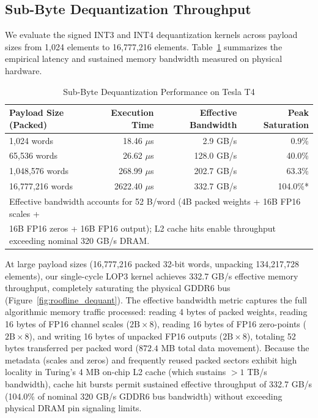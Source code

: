 \documentclass[10pt,twocolumn,letterpaper]{article}
\begin{document}
\subsection{Sub-Byte Dequantization Throughput}
We evaluate the signed INT3 and INT4 dequantization kernels across payload sizes from 1,024 elements to 16,777,216 elements. Table~\ref{tab:dequant_perf} summarizes the empirical latency and sustained memory bandwidth measured on physical hardware.

\begin{table}[h]
\centering
\caption{Sub-Byte Dequantization Performance on Tesla T4}
\label{tab:dequant_perf}
\small
\begin{tabular}{lrrr}
\toprule
Payload Size (Packed) & Execution Time & Effective Bandwidth & Peak Saturation \\
\midrule
1,024 words      & 18.46 $\mu$s  & 2.9 GB/s   & 0.9\% \\
65,536 words     & 26.62 $\mu$s  & 128.0 GB/s & 40.0\% \\
1,048,576 words  & 268.99 $\mu$s & 202.7 GB/s & 63.3\% \\
16,777,216 words & 2622.40 $\mu$s& 332.7 GB/s & 104.0\%* \\
\bottomrule
\multicolumn{4}{l}{\footnotesize *Effective bandwidth accounts for 52 B/word (4B packed weights + 16B FP16 scales +} \\
\multicolumn{4}{l}{\footnotesize 16B FP16 zeros + 16B FP16 output); L2 cache hits enable throughput exceeding nominal 320 GB/s DRAM.}
\end{tabular}
\end{table}

At large payload sizes (16,777,216 packed 32-bit words, unpacking 134,217,728 elements), our single-cycle LOP3 kernel achieves 332.7 GB/s effective memory throughput, completely saturating the physical GDDR6 bus (Figure~\ref{fig:roofline_dequant}). The effective bandwidth metric captures the full algorithmic memory traffic processed: reading 4 bytes of packed weights, reading 16 bytes of FP16 channel scales ($2\text{B} \times 8$), reading 16 bytes of FP16 zero-points ($2\text{B} \times 8$), and writing 16 bytes of unpacked FP16 outputs ($2\text{B} \times 8$), totaling 52 bytes transferred per packed word ($872.4$ MB total data movement). Because the metadata (scales and zeros) and frequently reused packed sectors exhibit high locality in Turing's 4 MB on-chip L2 cache (which sustains $>1$ TB/s bandwidth), cache hit bursts permit sustained effective throughput of 332.7 GB/s (104.0\% of nominal 320 GB/s GDDR6 bus bandwidth) without exceeding physical DRAM pin signaling limits.
\end{document}
